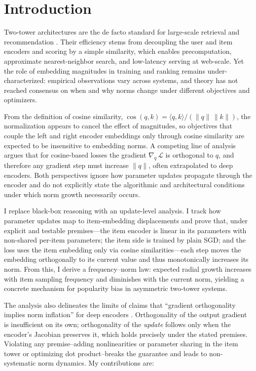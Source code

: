 \section{Introduction}
Two-tower architectures are the de facto standard for large-scale retrieval and recommendation \cite{huang2024retrievalsurvey}. Their efficiency stems from decoupling the user and item encoders and scoring by a simple similarity, which enables precomputation, approximate nearest-neighbor search, and low-latency serving at web-scale. Yet the role of embedding magnitudes in training and ranking remains under-characterized: empirical observations vary across systems, and theory has not reached consensus on when and why norms change under different objectives and optimizers.

From the definition of cosine similarity, \(\cos(q,k)=\langle q,k\rangle/(\|q\|\,\|k\|)\), the normalization appears to cancel the effect of magnitudes, so objectives that couple the left and right encoder embeddings only through cosine similarity are expected to be insensitive to embedding norms. A competing line of analysis argues \cite{wang2017normface,draganov2024pitfalls,draganov2025embeddingnorms} that for cosine-based losses the gradient \(\nabla_{q}\,\mathcal{L}\) is orthogonal to \(q\), and therefore any gradient step must increase \(\|q\|\), often extrapolated to deep encoders. Both perspectives ignore how parameter updates propagate through the encoder and do not explicitly state the algorithmic and architectural conditions under which norm growth necessarily occurs.

I replace black-box reasoning with an update-level analysis. I track how parameter updates map to item-embedding displacements and prove that, under explicit and testable premises—the item encoder is linear in its parameters with non-shared per-item parameters; the item side is trained by plain SGD; and the loss uses the item embedding only via cosine similarities—each step moves the embedding orthogonally to its current value and thus monotonically increases its norm. From this, I derive a frequency--norm law: expected radial growth increases with item sampling frequency and diminishes with the current norm, yielding a concrete mechanism for popularity bias in asymmetric two-tower systems.

The analysis also delineates the limits of claims that ``gradient orthogonality implies norm inflation'' for deep encoders \cite{wang2017normface,draganov2024pitfalls,draganov2025embeddingnorms}. Orthogonality of the output gradient is insufficient on its own; orthogonality of the \emph{update} follows only when the encoder's Jacobian preserves it, which holds precisely under the stated premises. Violating any premise--adding nonlinearities or parameter sharing in the item tower or optimizing dot product--breaks the guarantee and leads to non-systematic norm dynamics. My contributions are:

